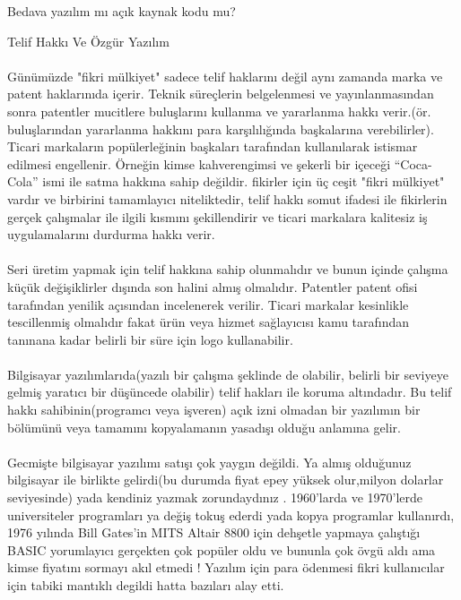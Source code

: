 \documentclass[10pt,a5paper]{book}
\begin{document}
\begin{section}{Bedava yazılım mı açık kaynak kodu mu?}
\begin{subsection}{Telif Hakkı Ve Özgür Yazılım}
\paragraph{}{Günümüzde "fikri mülkiyet" sadece telif haklarını değil aynı zamanda marka ve patent haklarınıda içerir. Teknik süreçlerin belgelenmesi  ve yayınlanmasından sonra patentler mucitlere buluşlarını kullanma ve yararlanma hakkı verir.(ör. buluşlarından yararlanma hakkını para karşılılığında başkalarına verebilirler). Ticari markaların popülerleğinin başkaları tarafından kullanılarak istismar edilmesi engellenir. Örneğin kimse  kahverengimsi ve şekerli bir içeceği “Coca-Cola” ismi ile satma hakkına sahip değildir. fikirler için üç ceşit "fikri mülkiyet"  vardır ve birbirini tamamlayıcı niteliktedir, telif hakkı somut ifadesi ile fikirlerin gerçek çalışmalar ile ilgili kısmını şekillendirir ve ticari markalara  kalitesiz iş uygulamalarını durdurma hakkı verir.}
\paragraph{}{Seri üretim yapmak için telif hakkına sahip olunmalıdır ve bunun içinde çalışma küçük değişiklirler dışında son halini almış olmalıdır. Patentler patent ofisi tarafından yenilik açısından incelenerek verilir. Ticari markalar kesinlikle tescillenmiş olmalıdır fakat ürün veya hizmet sağlayıcısı kamu tarafından tanınana kadar  belirli bir süre için logo kullanabilir.}
\paragraph{}{Bilgisayar yazılımlarıda(yazılı bir çalışma şeklinde de olabilir, belirli bir seviyeye gelmiş yaratıcı bir düşüncede olabilir) telif hakları ile koruma altındadır. Bu telif hakkı sahibinin(programcı veya işveren) açık izni olmadan bir yazılımın bir bölümünü veya tamamını kopyalamanın yasadışı olduğu anlamına gelir.}
\paragraph{}{Gecmişte bilgisayar yazılımı satışı çok yaygın değildi. Ya almış olduğunuz bilgisayar ile birlikte gelirdi(bu durumda fiyat epey yüksek olur,milyon dolarlar seviyesinde) yada kendiniz yazmak zorundaydınız . 1960'larda ve 1970'lerde universiteler programları ya değiş tokuş ederdi yada kopya programlar kullanırdı, 1976 yılında Bill Gates'in   MITS Altair 8800 için dehşetle yapmaya çalıştığı BASIC yorumlayıcı gerçekten çok popüler oldu ve bununla çok övgü aldı ama kimse fiyatını sormayı akıl etmedi ! Yazılım için para ödenmesi fikri kullanıcılar için tabiki mantıklı degildi hatta bazıları alay etti.}

\end{subsection}
\end{section}
\end{document}
